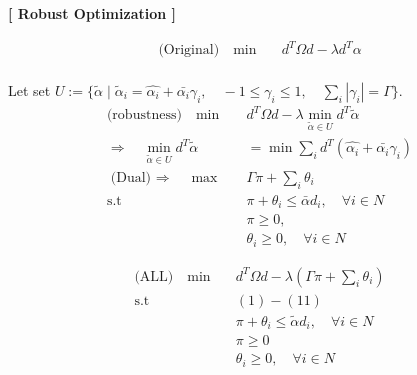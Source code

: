 \documentclass[11pt]{article}
\begin{document}
	
\centering\large \textbf{[ Robust Optimization ]}
	
	\begin{align*}
	\text{(Original)} \quad \min  \quad & d^T\Omega d  - \lambda d^T \alpha 
	\end{align*}
	\\
	Let set $U := \{ \tilde \alpha  \mid \tilde \alpha_i = \hat{\alpha_i} + \bar{\alpha_i}\gamma_i , \quad -1 \leq \gamma_i\leq 1 , \quad \sum_{i} |\gamma_i| = \Gamma \}$.
	\\
	
	
	\begin{align*}
	\text{(robustness)} \quad \min \quad & d^T\Omega d  - \lambda \min_{\tilde \alpha \in U } d^T \tilde{\alpha} \\
	\text{$\Rightarrow$} \quad \min_{\tilde \alpha \in U } d^T \tilde{\alpha} &= \min \sum_{i} d^T (\hat{\alpha_i} + \bar{\alpha_i}\gamma_i ) \\
	\text{(Dual) $\Rightarrow$} \quad \max \quad & \Gamma \pi + \sum_{i} \theta_i  \\
	\text{s.t} \quad & \pi + \theta_i \leq   \bar{\alpha} d_i, \quad \forall i \in N \\
	& \pi \geq 0, \quad \\
	&  \theta_i \geq 0, \quad \forall i \in N 
	\end{align*}
	
	
	\begin{align*}
	\text{(ALL)} \quad \min \quad & d^T\Omega d  -  \lambda (\Gamma \pi + \sum_{i} \theta_i  ) \\
	\text{s.t } \quad & (1) - (11)\\
	&\pi + \theta_i \leq   \tilde{\alpha} d_i, \quad \forall i \in N \\
	&\pi \geq 0 \\
	& \theta_i \geq 0, \quad \forall i \in N 
	\end{align*}
	
\end{document}
